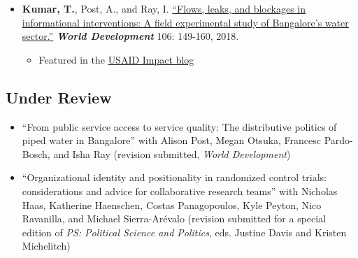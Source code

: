 \documentclass[11pt]{article}
\begin{document}
\begin{itemize}
\begin{itemize}
\end{itemize}

		\item[] \textbf{Kumar, T.}, Post, A., and Ray, I. \href{https://www.sciencedirect.com/science/article/pii/S0305750X1830032}{``Flows, leaks, and blockages in informational interventions: A field experimental study of Bangalore's water sector.''} \textit{\textbf{World Development} }106: 149-160, 2018.
		\begin{itemize}[nosep]
		\item Featured in the \href{https://blog.usaid.gov/2016/05/using-mobile-phones-to-alert-households-waiting-for-nextdrop-of-water/}{USAID Impact blog}
		\end{itemize}
		

\end{itemize}

\subsection*{Under Review}

\begin{itemize}


\item[]``From public service access to service quality: The distributive politics of piped water in Bangalore'' with Alison Post, Megan Otsuka, Francesc Pardo-Bosch, and Isha Ray (revision submitted, \textit{World Development})
	

	

	\item[]``Organizational identity and positionality in randomized control trials: considerations and advice for collaborative research teams'' with Nicholas Haas, Katherine Haenschen, Costas Panagopoulos, Kyle Peyton, Nico Ravanilla, and Michael  Sierra-Ar\'{e}valo (revision submitted for a special edition of \textit{PS: Political Science and Politics}, eds. Justine Davis and Kristen Michelitch)
		
		\end{itemize}
		
\end{document}
